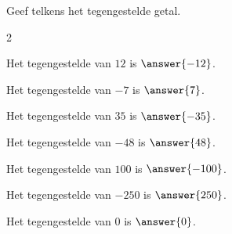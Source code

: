 \documentclass{ximera}
\begin{document}
    
    \begin{oefening}{\oefB\ESS}
    
    Geef telkens het tegengestelde getal.

    \begin{multicols}{2}
          
    \begin{question} Het tegengestelde van \(12\) is \(\answer{-12}\). \end{question}
    
    \begin{question} Het tegengestelde van \(-7\) is \(\answer{7}\). \end{question}
    
    \begin{question} Het tegengestelde van \(35\) is \(\answer{-35}\). \end{question}
    
    \begin{question} Het tegengestelde van \(-48\) is \(\answer{48}\). \end{question}
    
    \begin{question} Het tegengestelde van \(100\) is \(\answer{-100}\). \end{question}
    
    \begin{question} Het tegengestelde van \(-250\) is \(\answer{250}\). \end{question}
    
    \begin{question} Het tegengestelde van \(0\) is \(\answer{0}\). \end{question}
    
    \end{multicols}

    \end{oefening}
    
\end{document}

